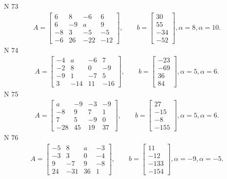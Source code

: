 \documentclass[11pt]{report}
\begin{document}
N 73
\begin{align*}
 A = \left[\begin{matrix}6 & 8 & -6 & 6\\6 & -9 & a & 9\\-8 & 3 & -5 & -5\\-6 & 26 & -22 & -12\end{matrix}\right],
    \qquad b = \left[\begin{matrix}30\\55\\-34\\-52\end{matrix}\right], \alpha = 8, \alpha = 10. 
 \end{align*}
N 74
\begin{align*}
 A = \left[\begin{matrix}-4 & a & -6 & 7\\-2 & 8 & 0 & -9\\-9 & 1 & -7 & 5\\3 & -14 & 11 & -16\end{matrix}\right],
    \qquad b = \left[\begin{matrix}-23\\-69\\36\\84\end{matrix}\right], \alpha = 5, \alpha = 6. 
 \end{align*}
N 75
\begin{align*}
 A = \left[\begin{matrix}a & -9 & -3 & -9\\-8 & 9 & 7 & 1\\7 & 5 & -9 & 0\\-28 & 45 & 19 & 37\end{matrix}\right],
    \qquad b = \left[\begin{matrix}27\\-15\\-8\\-155\end{matrix}\right], \alpha = 5, \alpha = 6. 
 \end{align*}
N 76
\begin{align*}
 A = \left[\begin{matrix}-5 & 8 & a & -3\\-3 & 3 & 0 & -4\\9 & -7 & 9 & -8\\24 & -31 & 36 & 1\end{matrix}\right],
    \qquad b = \left[\begin{matrix}11\\-12\\-133\\-154\end{matrix}\right], \alpha = -9, \alpha = -5. 
 \end{align*}
\end{document}
